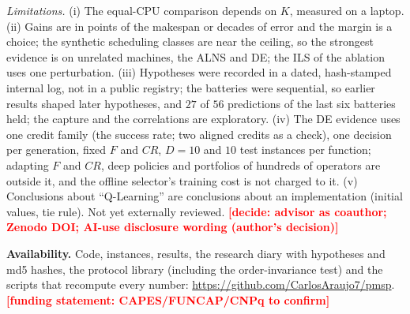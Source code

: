 \documentclass[conference,a4paper]{IEEEtran}
\newif\ifdraftmarks \draftmarkstrue
\newif\ifanon \anonfalse %
\newcommand{\todonote}[1]{\ifdraftmarks\textcolor{red}{\textbf{[#1]}}\fi}
\begin{document}
\emph{Limitations.} (i) The equal-CPU comparison depends on $K$, measured on a laptop. (ii) Gains are in points of the makespan or decades of error and the margin is a choice; the synthetic scheduling classes are near the ceiling, so the strongest evidence is on unrelated machines, the ALNS and DE; the ILS of the ablation uses one perturbation.
(iii) Hypotheses were recorded in a dated, hash-stamped internal log, not in a public registry; the batteries were sequential, so earlier results shaped later hypotheses, and $27$ of $56$ predictions of the last six batteries held; the capture and the correlations are exploratory.
(iv) The DE evidence uses one credit family (the success rate; two aligned credits as a check), one decision per generation, fixed $F$ and $CR$, $D=10$ and $10$ test instances per function; adapting $F$ and $CR$, deep policies and portfolios of hundreds of operators are outside it, and the offline selector's training cost is not charged to it.
(v) Conclusions about ``Q-Learning'' are conclusions about an implementation (initial values, tie rule).
Not yet externally reviewed. \todonote{decide: advisor as coauthor; Zenodo DOI; AI-use disclosure wording (author's decision)}

\vspace{1mm}
\noindent\textbf{Availability.} Code, instances, results, the research diary with hypotheses and md5 hashes, the protocol library (including the order-invariance test) and the scripts that recompute every number:
\ifanon an anonymized repository (link in the submission system).\else\url{https://github.com/CarlosAraujo7/pmsp}. \todonote{funding statement: CAPES/FUNCAP/CNPq to confirm}\fi



\end{document}
